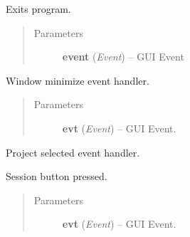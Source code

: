 \documentclass[letterpaper,10pt,english]{sphinxmanual}
\begin{document}
\begin{fulllineitems}

\begin{fulllineitems}
\label{wos:wos.GUI.OnExit}
Exits program.
\begin{quote}\begin{description}
\item[{Parameters}] \leavevmode
\textbf{event} (\emph{Event}) -- GUI Event

\end{description}\end{quote}

\end{fulllineitems}


\begin{fulllineitems}
\label{wos:wos.GUI.OnIconify}
Window minimize event handler.
\begin{quote}\begin{description}
\item[{Parameters}] \leavevmode
\textbf{evt} (\emph{Event}) -- GUI Event.

\end{description}\end{quote}

\end{fulllineitems}


\begin{fulllineitems}
\label{wos:wos.GUI.OnProjectSelected}
Project selected event handler.

\end{fulllineitems}


\begin{fulllineitems}
\label{wos:wos.GUI.OnSession}
Session button pressed.
\begin{quote}\begin{description}
\item[{Parameters}] \leavevmode
\textbf{evt} (\emph{Event}) -- GUI Event.

\end{description}\end{quote}


\end{fulllineitems}
\end{fulllineitems}
\end{document}
